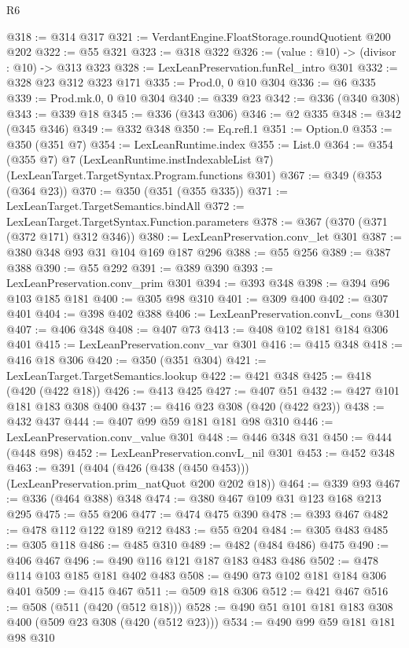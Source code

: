 \begin{lexlean}{R6}
\begin{coremodule}
@318 := @314 @317
@321 := VerdantEngine.FloatStorage.roundQuotient @200 @202
@322 := @55 @321
@323 := @318 @322
@326 := (value : @10) -> (divisor : @10) -> @313 @323
@328 := LexLeanPreservation.funRel_intro @301
@332 := @328 @23 @312 @323 @171
@335 := Prod.{0, 0} @10 @304
@336 := @6 @335
@339 := Prod.mk.{0, 0} @10 @304
@340 := @339 @23
@342 := @336 (@340 @308)
@343 := @339 @18
@345 := @336 (@343 @306)
@346 := @2 @335
@348 := @342 (@345 @346)
@349 := @332 @348
@350 := Eq.refl.{1}
@351 := Option.{0}
@353 := @350 (@351 @7)
@354 := LexLeanRuntime.index
@355 := List.{0}
@364 := @354
    (@355 @7)
    @7
    (LexLeanRuntime.instIndexableList @7)
    (LexLeanTarget.TargetSyntax.Program.functions @301)
@367 := @349 (@353 (@364 @23))
@370 := @350 (@351 (@355 @335))
@371 := LexLeanTarget.TargetSemantics.bindAll
@372 := LexLeanTarget.TargetSyntax.Function.parameters
@378 := @367 (@370 (@371 (@372 @171) @312 @346))
@380 := LexLeanPreservation.conv_let @301
@387 := @380 @348 @93 @31 @104 @169 @187 @296
@388 := @55 @256
@389 := @387 @388
@390 := @55 @292
@391 := @389 @390
@393 := LexLeanPreservation.conv_prim @301
@394 := @393 @348
@398 := @394 @96 @103 @185 @181
@400 := @305 @98 @310
@401 := @309 @400
@402 := @307 @401
@404 := @398 @402 @388
@406 := LexLeanPreservation.convL_cons @301
@407 := @406 @348
@408 := @407 @73
@413 := @408 @102 @181 @184 @306 @401
@415 := LexLeanPreservation.conv_var @301
@416 := @415 @348
@418 := @416 @18 @306
@420 := @350 (@351 @304)
@421 := LexLeanTarget.TargetSemantics.lookup
@422 := @421 @348
@425 := @418 (@420 (@422 @18))
@426 := @413 @425
@427 := @407 @51
@432 := @427 @101 @181 @183 @308 @400
@437 := @416 @23 @308 (@420 (@422 @23))
@438 := @432 @437
@444 := @407 @99 @59 @181 @181 @98 @310
@446 := LexLeanPreservation.conv_value @301
@448 := @446 @348 @31
@450 := @444 (@448 @98)
@452 := LexLeanPreservation.convL_nil @301
@453 := @452 @348
@463 := @391 (@404 (@426 (@438 (@450 @453))) (LexLeanPreservation.prim_natQuot @200 @202 @18))
@464 := @339 @93
@467 := @336 (@464 @388) @348
@474 := @380 @467 @109 @31 @123 @168 @213 @295
@475 := @55 @206
@477 := @474 @475 @390
@478 := @393 @467
@482 := @478 @112 @122 @189 @212
@483 := @55 @204
@484 := @305 @483
@485 := @305 @118
@486 := @485 @310
@489 := @482 (@484 @486) @475
@490 := @406 @467
@496 := @490 @116 @121 @187 @183 @483 @486
@502 := @478 @114 @103 @185 @181 @402 @483
@508 := @490 @73 @102 @181 @184 @306 @401
@509 := @415 @467
@511 := @509 @18 @306
@512 := @421 @467
@516 := @508 (@511 (@420 (@512 @18)))
@528 := @490 @51 @101 @181 @183 @308 @400 (@509 @23 @308 (@420 (@512 @23)))
@534 := @490 @99 @59 @181 @181 @98 @310

\end{coremodule}
\end{lexlean}
